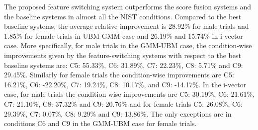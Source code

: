 \documentclass[preprint,12pt,5p]{elsarticle}
\begin{document}
%


The proposed feature switching system outperforms the score fusion systems and the baseline 
systems in almost all the NIST conditions. Compared to the best baseline systems, the average 
relative improvement is 28.92\% for male trials and 1.85\% for female trials in UBM-GMM case and 
26.19\% and 15.74\% in i-vector case. More specifically, for male trials in the GMM-UBM case, 
the condition-wise improvements given by the feature-switching systems with respect to the best 
baseline systems are: C5: 55.33\%, C6: 31.89\%, C7: 22.23\%, C8: 5.71\% and C9: 29.45\%.
Similarly for female trials the condition-wise improvements are C5: 16.21\%, C6: -22.20\%, C7: 
19.24\%, C8: 10.17\%, and C9: -14.17\%. In the i-vector case, for male trials the condition-wise 
improvements are C5: 30.19\%, C6: 21.61\%, C7: 21.10\%, C8: 37.32\% and C9: 20.76\% and 
for female trials C5: 26.08\%, C6: 29.39\%, C7: 0.07\%,  C8: 9.29\% and C9: 13.86\%. The only 
exceptions are in conditions C6 and C9 in the GMM-UBM case for female trials. %
\end{document}
